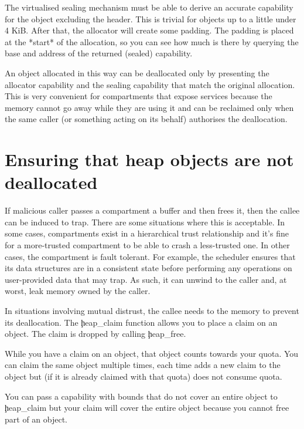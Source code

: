 \begin{note}
The virtualised sealing mechanism must be able to derive an accurate capability for the object excluding the header.
This is trivial for objects up to a little under 4 KiB.
After that, the allocator will create some padding.
The padding is placed at the *start* of the allocation, so you can see how much is there by querying the base and address of the returned (sealed) capability.
\end{note}

An object allocated in this way can be deallocated only by presenting  the allocator capability and the sealing capability that match the original allocation.
This is very convenient for compartments that expose services because the memory cannot go away while they are using it and can be reclaimed only when the same caller (or something acting on its behalf) authorises the deallocation.

\section[label=heap_claim]{Ensuring that heap objects are not deallocated}

If malicious caller passes a compartment a buffer and then frees it, then the callee can be induced to trap.
There are some situations where this is acceptable.
In some cases, compartments exist in a hierarchical trust relationship and it's fine for a more-trusted compartment to be able to crash a less-trusted one.
In other cases, the compartment is fault tolerant.
For example, the scheduler ensures that its data structures are in a consistent state before performing any operations on user-provided data that may trap.
As such, it can unwind to the caller and, at worst, leak memory owned by the caller.

In situations involving mutual distrust, the callee needs to  the memory to prevent its deallocation.
The \c{heap_claim} function allows you to place a claim on an object.
The claim is dropped by calling \c{heap_free}.

While you have a claim on an object, that object counts towards your quota.
You can claim the same object multiple times, each time adds a new claim to the object but (if it is already claimed with that quota) does not consume quota.

\begin{note}
You can pass a capability with bounds that do not cover an entire object to \c{heap_claim} but your claim will cover the entire object because you cannot free part of an object.
\end{note}


